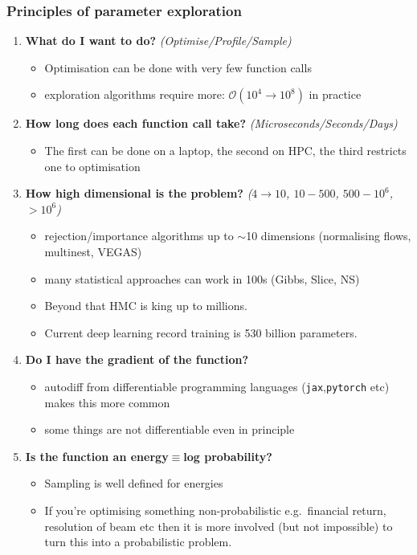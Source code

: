 \documentclass[aspectratio=169]{beamer}
\begin{document}
\begin{frame}
    \frametitle{Principles of parameter exploration}
    \begin{enumerate}
        \item \textbf{What do I want to do?}  \textit{(Optimise/Profile/Sample)}
            \begin{itemize}
                \item Optimisation can be done with very few function calls
                \item exploration algorithms require more: $\mathcal{O}(10^4\to10^8)$ in practice
            \end{itemize}
        \item \textbf{How long does each function call take?} \textit{(Microseconds/Seconds/Days)}
            \begin{itemize}
                \item The first can be done on a laptop, the second on HPC, the third restricts one to optimisation
            \end{itemize}
        \item \textbf{How high dimensional is the problem?} \textit{($4\to10$, $10-500$, $500-10^6$, $>10^6$)}
            \begin{itemize}
                \item rejection/importance algorithms up to $\sim$10 dimensions (normalising flows, multinest, VEGAS)
                \item many statistical approaches can work in 100s (Gibbs, Slice, NS)
                \item Beyond that HMC is king up to millions.
                \item Current deep learning record training is 530 billion parameters.
            \end{itemize}
        \item \textbf{Do I have the gradient of the function?}
            \begin{itemize}
                \item autodiff from differentiable programming languages (\texttt{jax},\texttt{pytorch} etc) makes this more common
                \item some things are not differentiable even in principle
            \end{itemize}
        \item \textbf{Is the function an energy$\equiv$log probability?}
            \begin{itemize}
                \item Sampling is well defined for energies
                \item If you're optimising something non-probabilistic e.g.\ financial return, resolution of beam etc then it is more involved (but not impossible) to turn this into a probabilistic problem.
            \end{itemize}
    \end{enumerate}
\end{frame}
\end{document}
